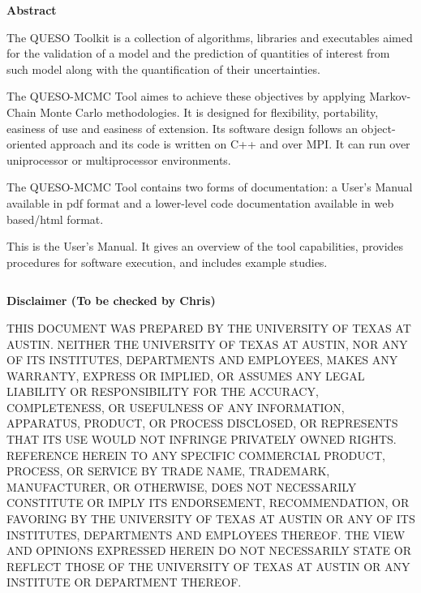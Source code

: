 \clearpage
\centerline{\Large\bf Abstract}
$~$\\
The QUESO Toolkit is a
collection of algorithms, libraries and executables aimed for
the validation of a model and
the prediction of quantities of interest from such model
along with the quantification of their uncertainties.

The QUESO-MCMC Tool aimes to achieve these objectives by applying Markov-Chain Monte Carlo methodologies.
It is designed for flexibility, portability, easiness of use and easiness of extension.
Its software design follows an object-oriented approach and
its code is written on C++ and over MPI.
It can run over uniprocessor or multiprocessor environments.

The QUESO-MCMC Tool contains two forms of documentation:
a User's Manual available in pdf format
and
a lower-level code documentation available in web based/html format.

This is the User's Manual.
It gives an overview of the tool capabilities,
provides procedures for software execution, and includes example studies.

\clearpage
$~$\\

\clearpage
\centerline{\Large\bf Disclaimer (To be checked by Chris)}
$~$\\
    THIS DOCUMENT WAS PREPARED
    BY THE UNIVERSITY OF TEXAS AT AUSTIN.
    NEITHER THE UNIVERSITY OF TEXAS
    AT AUSTIN, NOR ANY OF ITS INSTITUTES, DEPARTMENTS AND EMPLOYEES, MAKES ANY WARRANTY, EXPRESS OR IMPLIED,
    OR ASSUMES ANY LEGAL LIABILITY OR RESPONSIBILITY FOR THE ACCURACY, COMPLETENESS, OR
    USEFULNESS OF ANY INFORMATION, APPARATUS, PRODUCT, OR PROCESS DISCLOSED, OR REPRESENTS
    THAT ITS USE WOULD NOT INFRINGE PRIVATELY OWNED RIGHTS. REFERENCE HEREIN TO ANY SPECIFIC
    COMMERCIAL PRODUCT, PROCESS, OR SERVICE BY TRADE NAME, TRADEMARK, MANUFACTURER, OR OTHERWISE,
    DOES NOT NECESSARILY CONSTITUTE OR IMPLY ITS ENDORSEMENT, RECOMMENDATION, OR FAVORING BY
    THE UNIVERSITY OF TEXAS AT AUSTIN OR ANY OF ITS INSTITUTES, DEPARTMENTS AND EMPLOYEES THEREOF.
    THE VIEW AND OPINIONS EXPRESSED HEREIN DO NOT NECESSARILY STATE OR REFLECT
    THOSE OF THE UNIVERSITY OF TEXAS AT AUSTIN OR ANY INSTITUTE OR DEPARTMENT
    THEREOF.

